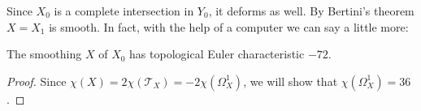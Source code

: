 Since $X_0$ is a complete intersection in $Y_0$, it deforms as well. By Bertini's theorem $X = X_1$ is smooth. In fact, with the help of a computer we can say a little more:

\begin{prop}
The smoothing $X$ of $X_0$ has topological Euler characteristic $-72$.
\end{prop}

\begin{proof}
Since $\chi(X) = 2\chi(\mathcal T_X) = -2\chi(\Omega_X^1)$, we will show that $\chi(\Omega_X^1)=36$. 
\end{proof}